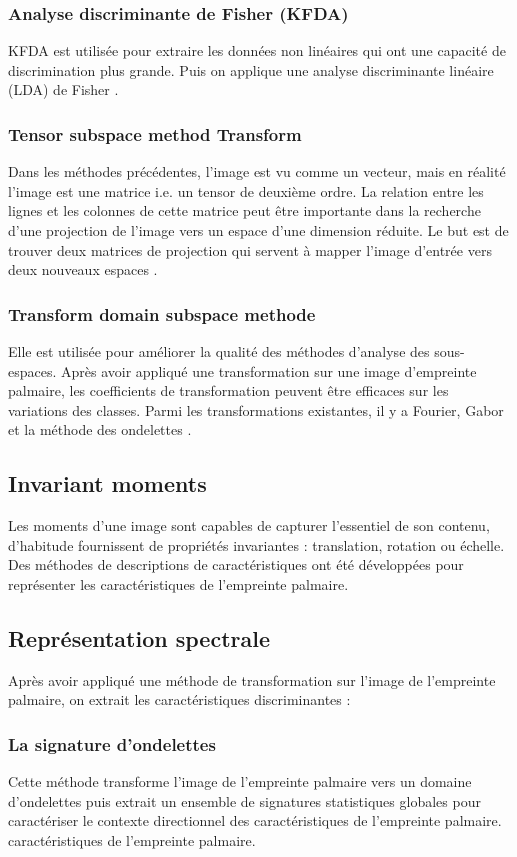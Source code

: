 \subsubsection{Analyse discriminante de Fisher (KFDA)}
 KFDA  est utilisée pour extraire les données non linéaires qui ont une capacité de discrimination plus grande. Puis on applique une analyse discriminante linéaire (LDA) de Fisher \citep{wang2006kernel}.
\subsubsection{Tensor subspace method Transform}
Dans les méthodes précédentes, l’image est vu comme un vecteur, mais en réalité l’image est une matrice i.e. un tensor de deuxième ordre. La relation entre les lignes et les colonnes de cette matrice peut être importante dans la recherche d’une projection de l’image vers un espace d’une dimension réduite. Le but est de trouver deux matrices de projection qui servent à mapper l’image d’entrée vers deux nouveaux espaces \citep{xiao2010novel}.
\subsubsection{Transform domain subspace methode}
Elle est utilisée pour améliorer la qualité des méthodes d’analyse des sous-espaces. Après avoir appliqué une transformation sur une image d’empreinte palmaire, les coefficients de transformation peuvent être efficaces sur les variations des classes. Parmi les transformations existantes, il y a Fourier, Gabor et la méthode des ondelettes \citep{zhang2012comparative}.
\subsection{Invariant moments}
Les moments d’une image sont capables de capturer l’essentiel de son contenu, d’habitude fournissent de propriétés invariantes : translation, rotation ou échelle. Des méthodes de descriptions de caractéristiques ont été développées pour représenter les caractéristiques de l’empreinte palmaire.

\subsection{Représentation spectrale}
Après avoir appliqué une méthode de transformation sur l’image de l’empreinte palmaire, on extrait les caractéristiques discriminantes :
\subsubsection{La signature d’ondelettes }
Cette méthode transforme l’image de l’empreinte palmaire vers un domaine d’ondelettes puis extrait un ensemble de signatures statistiques globales pour caractériser le contexte directionnel des caractéristiques de l’empreinte palmaire.
caractéristiques de l’empreinte palmaire.
